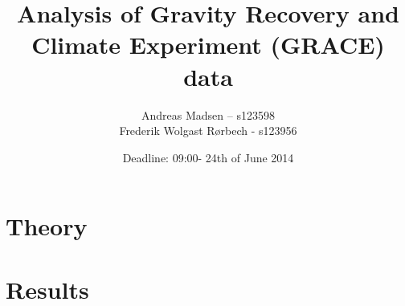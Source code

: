 \documentclass[a4paper]{article}
\numberwithin{equation}{section}
\numberwithin{figure}{section}
\numberwithin{table}{section}
\begin{document}
\title{Analysis of Gravity Recovery and Climate Experiment (GRACE) data}
\author{Andreas Madsen – s123598\\Frederik Wolgast Rørbech - s123956}
\date{Deadline: 09:00- 24th of June 2014}
\maketitle

\setcounter{tocdepth}{2}
\pagebreak
\tableofcontents
\pagebreak





\pagebreak
\section{Theory}












\pagebreak
\section{Results}







\pagebreak

\pagebreak


\pagebreak
\printbibliography
\end{document}
